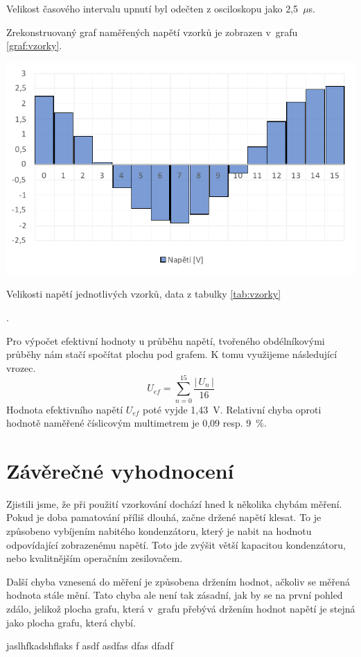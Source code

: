 \documentclass[a4paper,12pt]{article}   %
\newcommand{\tmu}{$\mu$}
\begin{document}
Velikost časového intervalu upnutí byl odečten z osciloskopu jako 2,5~\tmu s.

Zrekonstruovaný graf naměřených napětí vzorků je zobrazen v~grafu \ref{graf:vzorky}.

\begin{graf}
  \centering
  \includegraphics[width=.8\textwidth]{graf_vzorky.pdf}
  \caption{Velikosti napětí jednotlivých vzorků, data z tabulky \ref{tab:vzorky}}
  \label{graf:vzorky}
\end{graf}.

Pro výpočet efektivní hodnoty u průběhu napětí, tvořeného obdélníkovými průběhy nám stačí spočítat plochu pod grafem. K tomu využijeme následující vrozec.
\begin{equation}
  U_{ef} = \sum_{n=0}^{15} \frac{|\,U_n\,|}{16}
\end{equation}
Hodnota efektivního napětí $U_{ef}$ poté vyjde 1,43~V. Relativní chyba oproti hodnotě naměřené číslicovým multimetrem je 0,09 resp. 9~\%.


\section{Závěrečné vyhodnocení}
\label{chap:zaver}
Zjistili jsme, že při použití vzorkování dochází hned k několika chybám měření. Pokud je doba pamatování příliš dlouhá, začne držené napětí klesat. To je způsobeno vybíjením nabitého kondenzátoru, který je nabit na hodnotu odpovídající zobrazenému napětí. Toto jde zvýšit větší kapacitou kondenzátoru, nebo kvalitnějším operačním zesilovačem.

Další chyba vznesená do měření je způsobena držením hodnot, ačkoliv se měřená hodnota stále mění. Tato chyba ale není tak zásadní, jak by se na první pohled zdálo, jelikož plocha grafu, která v~grafu přebývá držením hodnot napětí je stejná jako plocha grafu, která chybí.

jaslhfkadshflaks
f
asdf
asdfas
dfas
dfadf
\end{document}
